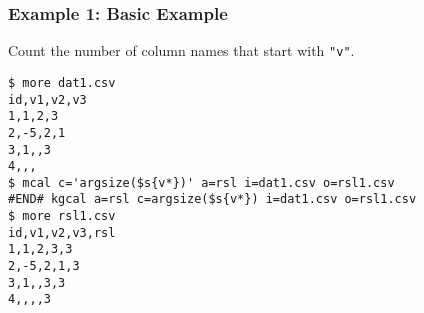\subsubsection*{Example 1: Basic Example}

Count the number of column names that start with \verb|"v"|.


\begin{Verbatim}[baselinestretch=0.7,frame=single]
$ more dat1.csv
id,v1,v2,v3
1,1,2,3
2,-5,2,1
3,1,,3
4,,,
$ mcal c='argsize($s{v*})' a=rsl i=dat1.csv o=rsl1.csv
#END# kgcal a=rsl c=argsize($s{v*}) i=dat1.csv o=rsl1.csv
$ more rsl1.csv
id,v1,v2,v3,rsl
1,1,2,3,3
2,-5,2,1,3
3,1,,3,3
4,,,,3
\end{Verbatim}
